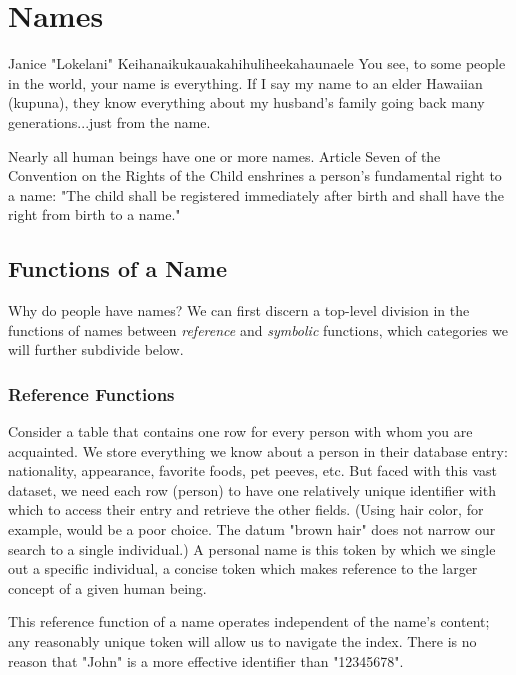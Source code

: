 \section{Names}

\begin{aquote}{Janice "Lokelani" Keihanaikukauakahihuliheekahaunaele}
You see, to some people in the world, your name is everything. If I say my name
to an elder Hawaiian (kupuna), they know everything about my husband's family
going back many generations...just from the name.
\end{aquote}

Nearly all human beings have one or more names. Article Seven of the Convention on
the Rights of the Child enshrines a person's fundamental right to a name: "The
child shall be registered immediately after birth and shall have the right from
birth to a name." \parencite{crc}

\subsection{Functions of a Name}

Why do people have names? We can first discern a top-level division in the
functions of names between \textit{reference} and \textit{symbolic} functions,
which categories we will further subdivide below.

\subsubsection{Reference Functions}

Consider a table that contains one row for every person with whom you are
acquainted. We store everything we know about a person in their database entry:
nationality, appearance, favorite foods, pet peeves, etc. But faced with this
vast dataset, we need each row (person) to have one relatively unique identifier
with which to access their entry and retrieve the other fields. (Using hair
color, for example, would be a poor choice. The datum "brown hair" does not
narrow our search to a single individual.) A personal name is this token by
which we single out a specific individual, a concise token which makes reference
to the larger concept of a given human being.

This reference function of a name operates independent of the name's content;
any reasonably unique token will allow us to navigate the index. There is no
reason that "John" is a more effective identifier than "12345678".


